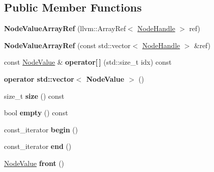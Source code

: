 \subsection*{Public Member Functions}
\begin{DoxyCompactItemize}
\item 
\mbox{\label{classglow_1_1_node_value_array_ref_ab34ca69176b12759e2e837ecde5f94c8}} 
{\bfseries Node\+Value\+Array\+Ref} (llvm\+::\+Array\+Ref$<$ \hyperlink{structglow_1_1_node_handle}{Node\+Handle} $>$ ref)
\item 
\mbox{\label{classglow_1_1_node_value_array_ref_a8e178b1020fce4a79978557d8e01db8e}} 
{\bfseries Node\+Value\+Array\+Ref} (const std\+::vector$<$ \hyperlink{structglow_1_1_node_handle}{Node\+Handle} $>$ \&ref)
\item 
\mbox{\label{classglow_1_1_node_value_array_ref_a5fba7c15b63ec9bedd38f74d97c39567}} 
const \hyperlink{structglow_1_1_node_value}{Node\+Value} \& {\bfseries operator\mbox{[}$\,$\mbox{]}} (std\+::size\+\_\+t idx) const
\item 
\mbox{\label{classglow_1_1_node_value_array_ref_a53abeee156bc1a8481e0be739f4aefc3}} 
{\bfseries operator std\+::vector$<$ Node\+Value $>$} ()
\item 
\mbox{\label{classglow_1_1_node_value_array_ref_aa7351a9e48e73b23614b4386ca487c60}} 
size\+\_\+t {\bfseries size} () const
\item 
\mbox{\label{classglow_1_1_node_value_array_ref_abe143e25e4e3760ffed0e937233695b1}} 
bool {\bfseries empty} () const
\item 
\mbox{\label{classglow_1_1_node_value_array_ref_aec1bed3875af791631670fac42752388}} 
const\+\_\+iterator {\bfseries begin} ()
\item 
\mbox{\label{classglow_1_1_node_value_array_ref_a602ad44453233e83a0eb65c433f42fe5}} 
const\+\_\+iterator {\bfseries end} ()
\item 
\mbox{\label{classglow_1_1_node_value_array_ref_ad3ed89c47261a53cd0a25c02674061cf}} 
\hyperlink{structglow_1_1_node_value}{Node\+Value} {\bfseries front} ()
\end{DoxyCompactItemize}



